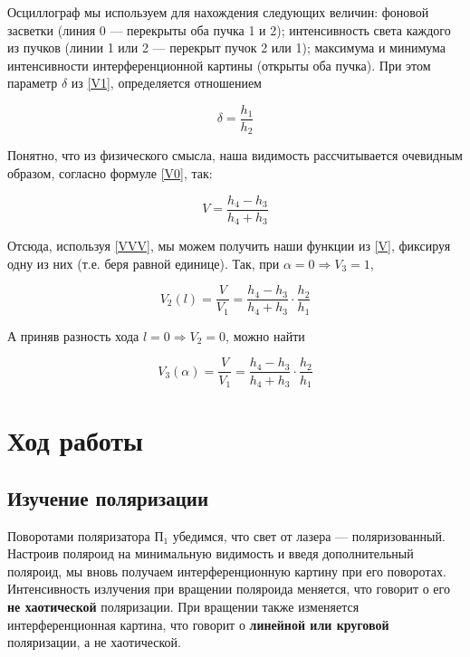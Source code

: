 \documentclass[12pt,a4paper]{article}
\begin{document}
    Осциллограф мы используем для нахождения следующих величин: фоновой засветки (линия 0 --- перекрыты оба пучка 1 и 2); интенсивность света каждого из пучков (линии 1 или 2 --- перекрыт пучок
    2 или 1); максимума и минимума интенсивности интерференционной
    картины (открыты оба пучка). При этом параметр $ \delta $ из \eqref{V1},  определяется отношением
    
    \begin{equation}\label{delta}
    \delta = \dfrac{h_1}{h_2}
    \end{equation}
    
    Понятно, что из физического смысла, наша видимость рассчитывается очевидным образом, согласно формуле \eqref{V0}, так:
    
    \begin{equation}\label{V}
    V = \dfrac{h_4 - h_3}{h_4 + h_3}
    \end{equation}
    
    Отсюда, используя \eqref{VVV}, мы можем получить наши функции из \eqref{V}, фиксируя одну из них (т.е. беря равной единице). Так, при $ \alpha = 0 \Rightarrow V_3 = 1 $, 
    
    \begin{equation}\label{V2}
    V_2 (l) = \dfrac{V}{V_1} = \dfrac{h_4 - h_3}{h_4 + h_3} \cdot \dfrac{h_2}{h_1}
    \end{equation}
    
    А приняв разность хода $ l = 0 \Rightarrow V_2 = 0 $, можно найти 
    
    \begin{equation}\label{V_3}
    V_3(\alpha) = \dfrac{V}{V_1} = \dfrac{h_4 - h_3}{h_4 + h_3} \cdot \dfrac{h_2}{h_1}
    \end{equation}
	
    \section*{Ход работы}
	

    \subsection*{Изучение поляризации}
    
    Поворотами поляризатора $ \text{П}_1 $ убедимся, что свет от лазера --- поляризованный. Настроив поляроид на минимальную видимость и введя дополнительный поляроид, мы вновь получаем интерференционную картину при его поворотах. Интенсивность излучения при вращении поляроида меняется, что говорит о его \textbf{не хаотической} поляризации. При вращении также изменяется интерференционная картина, что говорит о \textbf{линейной или круговой} поляризации, а не хаотической.
\end{document}
